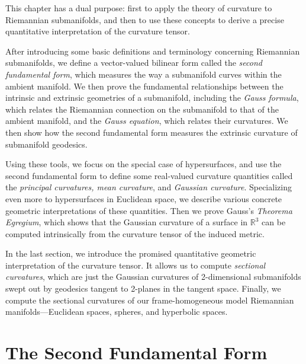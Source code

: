 
This chapter has a dual purpose: first to apply the theory of curvature to Riemannian submanifolds, and then to use these concepts to derive a precise quantitative interpretation of the curvature tensor.

After introducing some basic definitions and terminology concerning Riemannian submanifolds, we define a vector-valued bilinear form called the \emph{second fundamental form}, which measures the way a submanifold curves within the ambient manifold. We then prove the fundamental relationships between the intrinsic and extrinsic geometries of a submanifold, including the \emph{Gauss formula}, which relates the Riemannian connection on the submanifold to that of the ambient manifold, and the \emph{Gauss equation}, which relates their curvatures. We then show how the second fundamental form measures the extrinsic curvature of submanifold geodesics.

Using these tools, we focus on the special case of hypersurfaces, and use the second fundamental form to define some real-valued curvature quantities called the \emph{principal curvatures, mean curvature}, and \emph{Gaussian curvature}. Specializing even more to hypersurfaces in Euclidean space, we describe various concrete geometric interpretations of these quantities. Then we prove Gauss's \emph{Theorema Egregium}, which shows that the Gaussian curvature of a surface in $\mathbb{R}^3$ can be computed intrinsically from the curvature tensor of the induced metric.

In the last section, we introduce the promised quantitative geometric interpretation of the curvature tensor. It allows us to compute \emph{sectional curvatures}, which are just the Gaussian curvatures of 2-dimensional submanifolds swept out by geodesics tangent to 2-planes in the tangent space. Finally, we compute the sectional curvatures of our frame-homogeneous model Riemannian manifolds---Euclidean spaces, spheres, and hyperbolic spaces.

\section{The Second Fundamental Form}

